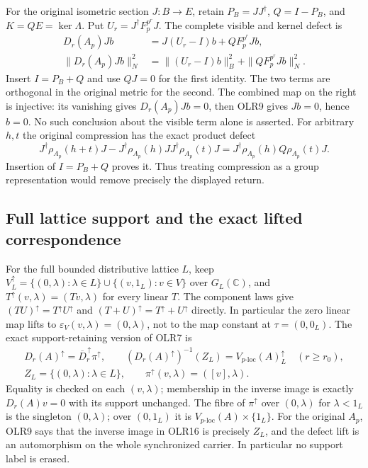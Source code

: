 For the original isometric section $J:B\to E$, retain
$P_B=JJ^\dagger$, $Q=I-P_B$, and $K=QE=\ker\Lambda$.
Put $U_r=J^\dagger F_p^{p^r}J$.
The complete visible and kernel defect is
\[
\begin{split}
D_r(A_p)Jb&=J(U_r-I)b+QF_p^{p^r}Jb,\\
\|D_r(A_p)Jb\|_N^2
&=\|(U_r-I)b\|_B^2+\|QF_p^{p^r}Jb\|_N^2.
\end{split}
\tag{OLR14}
\]
Insert $I=P_B+Q$ and use $QJ=0$ for the first identity.
The two terms are orthogonal in the original metric for the second.
The combined map on the right is injective: its vanishing gives
$D_r(A_p)Jb=0$, then OLR9 gives $Jb=0$, hence $b=0$.
No such conclusion about the visible term alone is asserted.
For arbitrary $h,t$ the original compression has the exact product
defect
\[
J^\dagger\rho_{A_p}(h+t)J
-J^\dagger\rho_{A_p}(h)J J^\dagger\rho_{A_p}(t)J
=J^\dagger\rho_{A_p}(h)Q\rho_{A_p}(t)J.
\tag{OLR15}
\]
Insertion of $I=P_B+Q$ proves it. Thus treating compression as a
group representation would remove precisely the displayed return.

\subsection{Full lattice support and the exact lifted correspondence}

For the full bounded distributive lattice $L$, keep
$V_L^\uparrow=\{(0,\lambda):\lambda\in L\}
\cup\{(v,1_L):v\in V\}$ over $G_L(\mathbb C)$, and
$T^\uparrow(v,\lambda)=(Tv,\lambda)$ for every linear $T$.
The component laws give
$(TU)^\uparrow=T^\uparrow U^\uparrow$ and
$(T+U)^\uparrow=T^\uparrow+U^\uparrow$ directly.
In particular the zero linear map lifts to
$\varepsilon_V(v,\lambda)=(0,\lambda)$, not to the map constant
at $\tau=(0,0_L)$.
The exact support-retaining version of OLR7 is
\[
\begin{gathered}
D_r(A)^\uparrow
=\overline D_r^{\,\uparrow}\pi^\uparrow,\qquad
(D_r(A)^\uparrow)^{-1}(Z_L)
=V_{p\text{-loc}}(A)_L^\uparrow\quad(r\ge r_0),\\
Z_L=\{(0,\lambda):\lambda\in L\},\qquad
\pi^\uparrow(v,\lambda)=([v],\lambda).
\end{gathered}
\tag{OLR16}
\]
Equality is checked on each $(v,\lambda)$; membership in the
inverse image is exactly $D_r(A)v=0$ with its support unchanged.
The fibre of $\pi^\uparrow$ over $(0,\lambda)$ for $\lambda<1_L$
is the singleton $(0,\lambda)$; over $(0,1_L)$ it is
$V_{p\text{-loc}}(A)\times\{1_L\}$.
For the original $A_p$, OLR9 says that the inverse image in OLR16
is precisely $Z_L$, and the defect lift is an automorphism on the
whole synchronized carrier. In particular no support label is erased.

